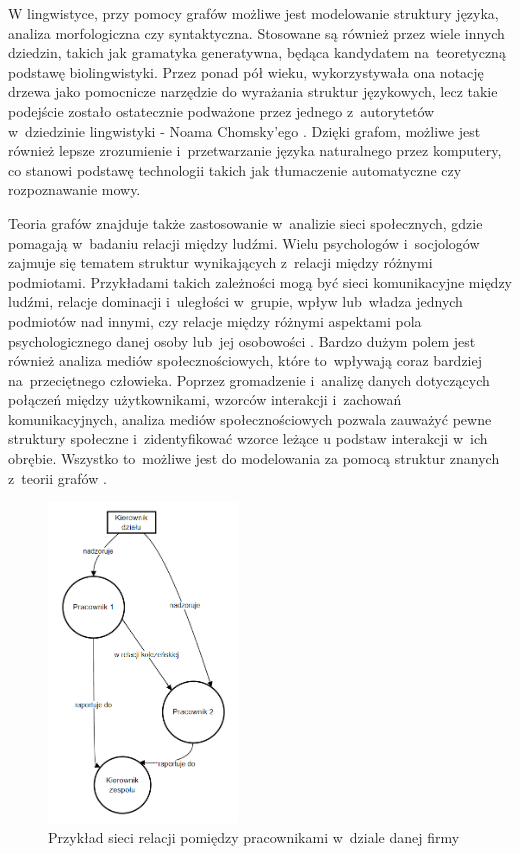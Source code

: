 W lingwistyce, przy pomocy grafów możliwe jest modelowanie struktury języka, analiza morfologiczna czy syntaktyczna.
Stosowane są również przez wiele innych dziedzin, takich jak gramatyka generatywna,
będąca kandydatem na~teoretyczną podstawę biolingwistyki.
Przez ponad pół wieku, wykorzystywała ona notację drzewa jako pomocnicze narzędzie do wyrażania struktur językowych,
lecz takie podejście zostało ostatecznie podważone przez jednego z~autorytetów w~dziedzinie lingwistyki - Noama Chomsky'ego \cite{Arikawa2019}.
Dzięki grafom, możliwe jest również lepsze zrozumienie i~przetwarzanie języka naturalnego przez komputery,
co stanowi podstawę technologii takich jak tłumaczenie automatyczne czy rozpoznawanie mowy.

Teoria grafów znajduje także zastosowanie w~analizie sieci społecznych, gdzie pomagają w~badaniu relacji między ludźmi.
Wielu psychologów i~socjologów zajmuje się tematem struktur wynikających z~relacji między różnymi podmiotami.
Przykładami takich zależności mogą być sieci komunikacyjne między ludźmi, relacje dominacji i~uległości w~grupie,
wpływ lub~władza jednych podmiotów nad innymi, czy relacje między różnymi aspektami pola psychologicznego danej osoby lub~jej osobowości \cite{Harary1953}.
Bardzo dużym polem jest również analiza mediów społecznościowych, które to~wpływają coraz bardziej na~przeciętnego człowieka.
Poprzez gromadzenie i~analizę danych dotyczących połączeń między użytkownikami, wzorców interakcji i~zachowań komunikacyjnych,
analiza mediów społecznościowych pozwala zauważyć pewne struktury społeczne i~zidentyfikować wzorce leżące u podstaw interakcji w~ich obrębie.
Wszystko to~możliwe jest do modelowania za pomocą struktur znanych z~teorii grafów \cite{Umami2024}.

\begin{figure}[ht]
	\centering
	\includegraphics[height=8.5cm]{resources/introduction/images/social.png}
	\caption{Przykład sieci relacji pomiędzy pracownikami w~dziale danej firmy}
    \label{Fig:intro-5}
\end{figure}
\FloatBarrier

